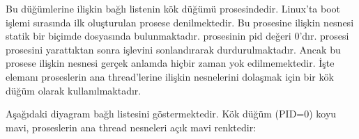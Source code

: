 \documentclass[a4paper,10pt,turkish]{sphinxmanual}
\begin{document}
\sphinxAtStartPar
Bu  düğümlerine ilişkin bağlı listenin kök düğümü  prosesindedir. Linux’ta boot
işlemi sırasında ilk oluşturulan prosese  denilmektedir. Bu  prosesine ilişkin
 nesnesi statik bir biçimde  dosyasında bulunmaktadır. 
prosesinin pid değeri 0’dır.  prosesi  prosesini yarattıktan sonra işlevini sonlandırarak
durdurulmaktadır. Ancak bu prosese ilişkin  nesnesi gerçek anlamda hiçbir zaman yok
edilmemektedir. İşte  elemanı proseslerin ana thread’lerine ilişkin 
nesnelerini dolaşmak için bir kök düğüm olarak kullanılmaktadır.

\sphinxAtStartPar
Aşağıdaki diyagram  bağlı listesini göstermektedir. Kök düğüm  (PID=0) koyu mavi,
proseslerin ana thread  nesneleri açık mavi renktedir:

\end{document}
